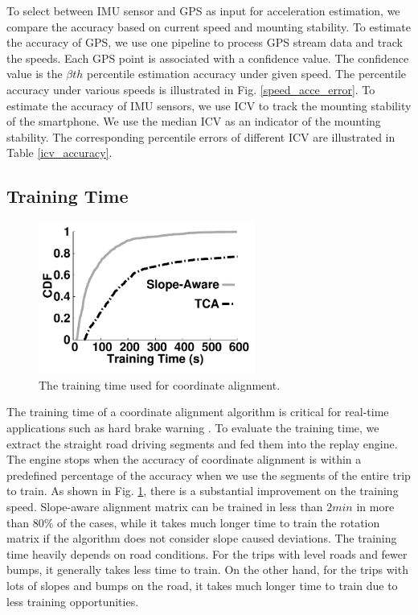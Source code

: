 To select between IMU sensor and GPS as input
for acceleration estimation, 
we compare the accuracy based on current speed and 
mounting stability. 
To estimate the accuracy of GPS, 
we use one pipeline to process GPS stream data 
and track the speeds. 
Each GPS point is associated with a confidence value. 
The confidence value is the $\beta$$th$ percentile
estimation accuracy under given speed.
The percentile accuracy under various speeds
is illustrated in Fig. \ref{speed_acce_error}.
To estimate the accuracy of IMU sensors, 
we use ICV to track the mounting stability of the smartphone. 
We use the median ICV as an indicator of
the mounting stability. 
The corresponding percentile errors of different
ICV are illustrated in Table \ref{icv_accuracy}.



\subsection{Training Time}

\begin{figure}[!htbp]
\begin{center}
\includegraphics[width=2.8in,angle=0]{Figs/DriveSense/slopeaware/alignment.pdf}
\vspace{-0.2cm}
\caption{The training time used for coordinate alignment.}
\label{alignmenttime}
\vspace{-0.3cm}
\end{center}
\end{figure}

The training time of a coordinate alignment algorithm is critical
for real-time applications such as hard brake warning \cite{snapshot}. 
To evaluate the training time, we extract the straight road driving segments and fed them into the replay engine.
The engine stops when the accuracy of coordinate alignment is within
a predefined percentage of the accuracy when we use the segments of the entire trip to train.
As shown in Fig. \ref{alignmenttime}, 
there is a substantial improvement on the training speed.
Slope-aware alignment matrix can be trained in less than $2min$ in more than
$80\%$ of the cases, 
while it takes much longer time to train the rotation matrix if
the algorithm does not consider slope caused deviations.
The training time heavily depends on road conditions. 
For the trips with level roads and fewer bumps, it generally
takes less time to train.
On the other hand, for the trips with lots of slopes and bumps on the road, 
it takes much longer time to train due to less training opportunities.


